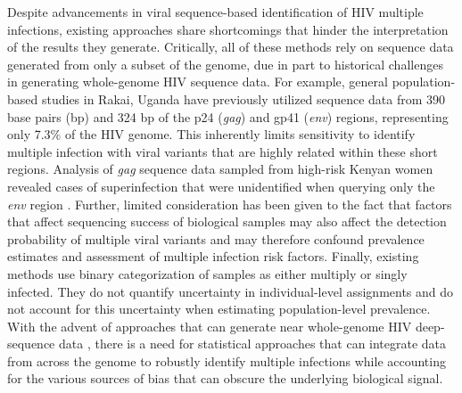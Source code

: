 \documentclass[10pt,letterpaper]{article}
\begin{document}
Despite advancements in viral sequence-based identification of HIV multiple infections, existing approaches share shortcomings that hinder the interpretation of the results they generate. Critically, all of these methods rely on sequence data generated from only a subset of the genome, due in part to historical challenges in generating whole-genome HIV sequence data. For example, general population-based studies in Rakai, Uganda have previously utilized sequence data from 390 base pairs (bp) and 324 bp of the p24 (\textit{gag}) and gp41 (\textit{env}) regions, representing only 7.3\% of the HIV genome. This inherently limits sensitivity to identify multiple infection with viral variants that are highly related within these short regions. Analysis of \textit{gag} sequence data sampled from high-risk Kenyan women revealed cases of superinfection that were unidentified when querying only the \textit{env} region \cite{piantadosi2008}. Further, limited consideration has been given to the fact that factors that affect sequencing success of biological samples \cite{bonsall2020} may also affect the detection probability of multiple viral variants and may therefore confound prevalence estimates and assessment of multiple infection risk factors. Finally, existing methods use binary categorization of samples as either multiply or singly infected. They do not quantify uncertainty in individual-level assignments and do not account for this uncertainty when estimating population-level prevalence. With the advent of approaches that can generate near whole-genome HIV deep-sequence data \cite{gall2012, bonsall2020}, there is a need for statistical approaches that can integrate data from across the genome to robustly identify multiple infections while accounting for the various sources of bias that can obscure the underlying biological signal. \par
\end{document}

